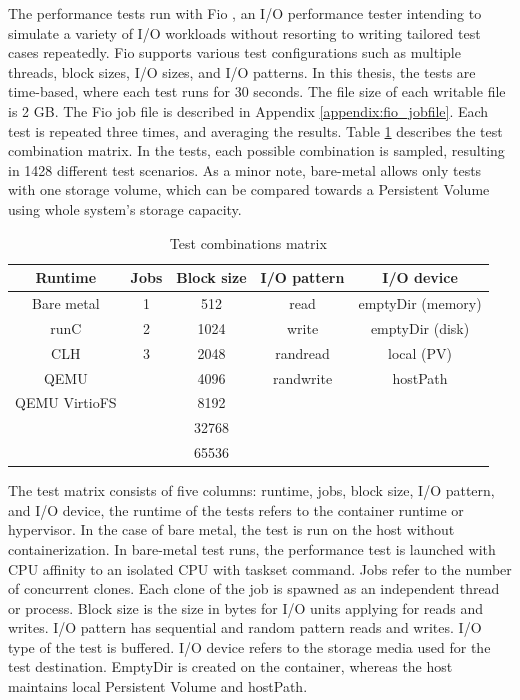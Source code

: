 The performance tests run with Fio \cite{FIO}, an I/O performance tester intending to simulate a variety of I/O workloads without resorting to writing tailored test cases repeatedly. Fio supports various test configurations such as multiple threads, block sizes, I/O sizes, and I/O patterns. In this thesis, the tests are time-based, where each test runs for 30 seconds. The file size of each writable file is 2 GB. The Fio job file is described in Appendix \ref{appendix:fio_jobfile}. Each test is repeated three times, and averaging the results. Table \ref{table:TestMatrix} describes the test combination matrix. In the tests, each possible combination is sampled, resulting in 1428 different test scenarios. As a minor note, bare-metal allows only tests with one storage volume, which can be compared towards a Persistent Volume using whole system's storage capacity.

\begin{table}[ht]
\centering
\caption{Test combinations matrix}
\vspace{\baselineskip}
\begin{tabular}{| c | c | c | c | c |}
\hline
\textbf{Runtime} & \textbf{Jobs} & \textbf{Block size} & \textbf{I/O pattern} & \textbf{I/O device} \\ 
\hline
Bare metal & 1 & 512 & read & emptyDir (memory) \\
\hline
runC & 2 & 1024 & write & emptyDir (disk) \\ 
\hline
CLH & 3 & 2048 & randread & local (PV) \\
\hline
QEMU & & 4096 & randwrite & hostPath \\
\hline
QEMU VirtioFS & & 8192 & & \\
\hline
& & 32768 & & \\
\hline
& & 65536 & & \\
\hline
\end{tabular}
\label{table:TestMatrix}
\end{table}

The test matrix consists of five columns: runtime, jobs, block size, I/O pattern, and I/O device, the runtime of the tests refers to the container runtime or hypervisor. In the case of bare metal, the test is run on the host without containerization. In bare-metal test runs, the performance test is launched with CPU affinity to an isolated CPU with taskset \cite{taskset} command. Jobs refer to the number of concurrent clones. Each clone of the job is spawned as an independent thread or process. Block size is the size in bytes for I/O units applying for reads and writes. I/O pattern has sequential and random pattern reads and writes. I/O type of the test is buffered. I/O device refers to the storage media used for the test destination. EmptyDir is created on the container, whereas the host maintains local Persistent Volume and hostPath.

